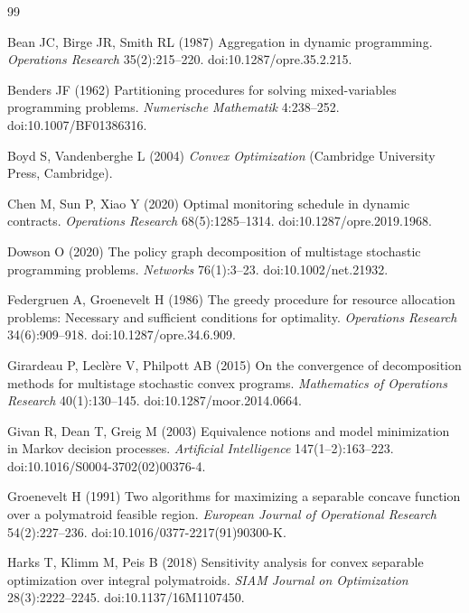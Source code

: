 \begin{thebibliography}{99}\raggedright
{}
Bean JC, Birge JR, Smith RL (1987) Aggregation in dynamic programming. \emph{Operations Research} 35(2):215--220. doi:10.1287/opre.35.2.215.

Benders JF (1962) Partitioning procedures for solving mixed-variables programming problems. \emph{Numerische Mathematik} 4:238--252. doi:10.1007/BF01386316.

Boyd S, Vandenberghe L (2004) \emph{Convex Optimization} (Cambridge University Press, Cambridge).

Chen M, Sun P, Xiao Y (2020) Optimal monitoring schedule in dynamic contracts. \emph{Operations Research} 68(5):1285--1314. doi:10.1287/opre.2019.1968.

Dowson O (2020) The policy graph decomposition of multistage stochastic programming problems. \emph{Networks} 76(1):3--23. doi:10.1002/net.21932.

Federgruen A, Groenevelt H (1986) The greedy procedure for resource allocation problems: Necessary and sufficient conditions for optimality. \emph{Operations Research} 34(6):909--918. doi:10.1287/opre.34.6.909.

Girardeau P, Lecl\`ere V, Philpott AB (2015) On the convergence of decomposition methods for multistage stochastic convex programs. \emph{Mathematics of Operations Research} 40(1):130--145. doi:10.1287/moor.2014.0664.

Givan R, Dean T, Greig M (2003) Equivalence notions and model minimization in Markov decision processes. \emph{Artificial Intelligence} 147(1--2):163--223. doi:10.1016/S0004-3702(02)00376-4.

Groenevelt H (1991) Two algorithms for maximizing a separable concave function over a polymatroid feasible region. \emph{European Journal of Operational Research} 54(2):227--236. doi:10.1016/0377-2217(91)90300-K.

Harks T, Klimm M, Peis B (2018) Sensitivity analysis for convex separable optimization over integral polymatroids. \emph{SIAM Journal on Optimization} 28(3):2222--2245. doi:10.1137/16M1107450.


\end{thebibliography}
